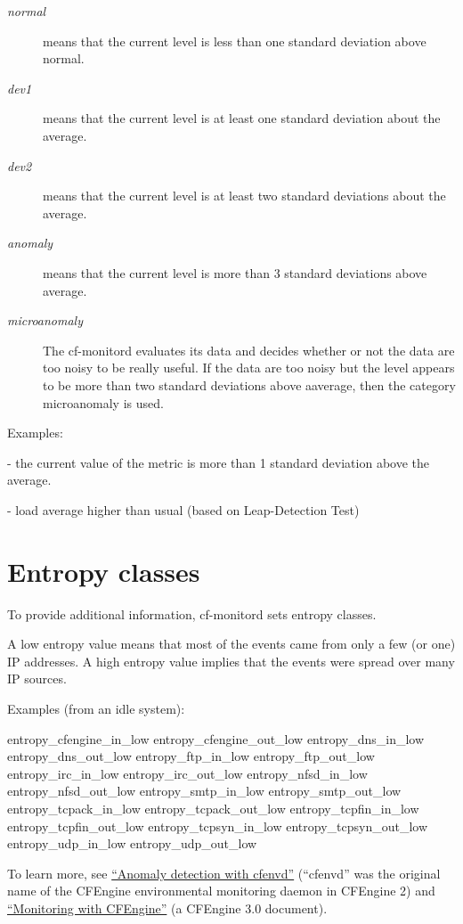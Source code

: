 \begin{description}
\item[\emph{normal}] means that the current level is less than one standard deviation above normal.



\item[\emph{dev1}] means that the current level is at least one standard deviation about the average.



\item[\emph{dev2}] means that the current level is at least two standard deviations about the average.



\item[\emph{anomaly}] means that the current level is more than 3 standard deviations above average.



\item[\emph{microanomaly}] The cf-monitord evaluates its data and decides whether or not the data are too noisy to be really useful. If the data are too noisy but the level appears to be more than two standard deviations above aaverage, then the category microanomaly is used.
\end{description}

Examples:

 - the current value of the metric is more than 1 standard deviation above the average.

 - load average higher than usual (based on Leap-Detection Test)

\section{Entropy classes}

To provide additional information, cf-monitord sets entropy classes.

A low entropy value means that most of the events came from only a few (or one) IP addresses. A high entropy value implies that the events were spread over many IP sources.

Examples (from an idle system):

\begin{code}
entropy_cfengine_in_low
entropy_cfengine_out_low
entropy_dns_in_low
entropy_dns_out_low
entropy_ftp_in_low
entropy_ftp_out_low
entropy_irc_in_low
entropy_irc_out_low
entropy_nfsd_in_low
entropy_nfsd_out_low
entropy_smtp_in_low
entropy_smtp_out_low
entropy_tcpack_in_low
entropy_tcpack_out_low
entropy_tcpfin_in_low
entropy_tcpfin_out_low
entropy_tcpsyn_in_low
entropy_tcpsyn_out_low
entropy_udp_in_low
entropy_udp_out_low
\end{code}

To learn more, see \href{http://www.iu.hio.no/cfengine/docs/cfengine-Anomalies.pdf}{``Anomaly detection with cfenvd''} 
(``cfenvd'' was the original name of the CFEngine environmental monitoring daemon in CFEngine 2) and
\href{https://auth.cfengine.com/archive/manuals/st-monitoring}{``Monitoring with CFEngine''} (a CFEngine 3.0 document).